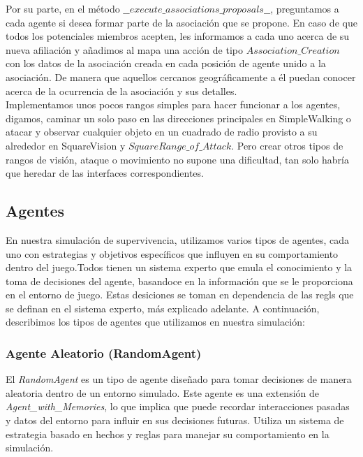\documentclass[11pt]{article}
\begin{document}
Por su parte, en el método $\_\_execute\_associations\_proposals\_\_$, preguntamos a cada agente si desea formar parte de la asociación que se propone. En caso de que todos los potenciales miembros acepten, les informamos a cada uno acerca de su nueva afiliación y añadimos al mapa una acción de tipo $Association\_Creation$ con los datos de la asociación creada en cada posición de agente unido a la asociación. De manera que aquellos cercanos geográficamente a él puedan conocer acerca de la ocurrencia de la asociación y sus detalles.\\
Implementamos unos pocos rangos simples para hacer funcionar a los agentes, digamos, caminar un solo paso en las direcciones principales en SimpleWalking o atacar y observar cualquier objeto en un cuadrado de radio provisto a su alrededor en SquareVision y $SquareRange\_of\_Attack$. Pero crear otros tipos de rangos de visión, ataque o movimiento no supone una dificultad, tan solo habría que heredar de las interfaces correspondientes.\\
\subsection{Agentes}
En nuestra simulación de supervivencia, utilizamos varios tipos de agentes, cada uno con estrategias y objetivos específicos que influyen en su comportamiento dentro del juego.Todos tienen un sistema experto que emula el conocimiento y la toma de decisiones del agente,
basandoce en la información que se le proporciona en el entorno de juego. Estas desiciones se toman en dependencia de las regls que se definan en el sistema experto, más explicado adelante. A continuación, describimos los tipos de agentes que utilizamos en nuestra simulación:

\subsubsection{Agente Aleatorio (RandomAgent)}
El \textit{RandomAgent} es un tipo de agente diseñado para tomar decisiones de manera aleatoria dentro de un entorno simulado. Este agente es una extensión de \textit{Agent\_with\_Memories}, lo que implica que puede recordar interacciones pasadas y datos del entorno para influir en sus decisiones futuras. Utiliza un sistema de estrategia basado en hechos y reglas para manejar su comportamiento en la simulación.
\end{document}
